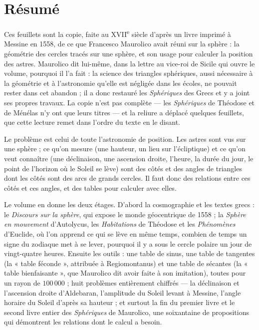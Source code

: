 \documentclass[11pt,a4paper]{article}
\begin{document}
\section*{Résumé}

\begin{resume}
Ces feuillets sont la copie, faite au XVII\textsuperscript{e} siècle d'après un
livre imprimé à Messine en 1558, de ce que Francesco Maurolico avait réuni sur la
sphère : la géométrie des cercles tracés sur une sphère, et son usage pour
calculer la position des astres. Maurolico dit lui-même, dans la lettre au
vice-roi de Sicile qui ouvre le volume, pourquoi il l'a fait : la science des
triangles sphériques, aussi nécessaire à la géométrie et à l'astronomie qu'elle
est négligée dans les écoles, ne pouvait rester dans cet abandon ; il a donc
restauré les \emph{Sphériques} des Grecs et y a joint ses propres travaux. La
copie n'est pas complète — les \emph{Sphériques} de Théodose et de Ménélas n'y
ont que leurs titres — et la reliure a déplacé quelques feuillets, que cette
lecture remet dans l'ordre du texte en le disant.

Le problème est celui de toute l'astronomie de position. Les astres sont vus sur
une sphère ; ce qu'on mesure (une hauteur, un lieu sur l'écliptique) et ce qu'on
veut connaître (une déclinaison, une ascension droite, l'heure, la durée du jour,
le point de l'horizon où le Soleil se lève) sont des côtés et des angles de
triangles dont les côtés sont des arcs de grands cercles. Il faut donc des
relations entre ces côtés et ces angles, et des tables pour calculer avec elles.

Le volume en donne les deux étages. D'abord la cosmographie et les textes grecs :
le \emph{Discours sur la sphère}, qui expose le monde géocentrique de 1558 ; la
\emph{Sphère en mouvement} d'Autolycus, les \emph{Habitations} de Théodose et les
\emph{Phénomènes} d'Euclide, où l'on apprend ce qui se lève en même temps, combien
de temps un signe du zodiaque met à se lever, pourquoi il y a sous le cercle
polaire un jour de vingt-quatre heures. Ensuite les outils : une table de sinus,
une table de tangentes (la « table féconde », attribuée à Regiomontanus) et une
table de sécantes (la « table bienfaisante », que Maurolico dit avoir faite à
son imitation), toutes pour un rayon de $100\,000$ ; huit problèmes entièrement
chiffrés — la déclinaison et l'ascension droite d'Aldebaran, l'amplitude du
Soleil levant à Messine, l'angle horaire du Soleil d'après sa hauteur ; et
surtout la fin du premier livre et le second livre entier des \emph{Sphériques}
de Maurolico, une soixantaine de propositions qui démontrent les relations dont le calcul a
besoin.


\end{resume}
\end{document}
